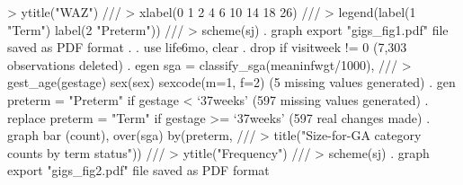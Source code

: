 >         ytitle("WAZ") ///
>         xlabel(0 1 2 4 6 10 14 18 26) ///
>         legend(label(1 "Term") label(2 "Preterm")) ///
>         scheme(sj)
{\smallskip}
. graph export "gigs_fig1.pdf"
file{} saved as PDF format
{\smallskip}
. 
. use life6mo, clear
{\smallskip}
. drop if visitweek != 0
(7,303 observations deleted)
{\smallskip}
. egen sga = classify_sga(meaninfwgt/1000), ///
>         gest_age(gestage) sex(sex) sexcode(m=1, f=2)
(5 missing values generated)
{\smallskip}
. gen preterm = "Preterm" if gestage < `37weeks'
(597 missing values generated)
{\smallskip}
. replace preterm = "Term" if gestage >= `37weeks'
(597 real changes made)
{\smallskip}
. graph bar (count), over(sga) by(preterm, ///
>     title("Size-for-GA category counts by term status")) ///
>         ytitle("Frequency") ///
>         scheme(sj)
{\smallskip}
. graph export "gigs_fig2.pdf"
file{} saved as PDF format
{\smallskip}
